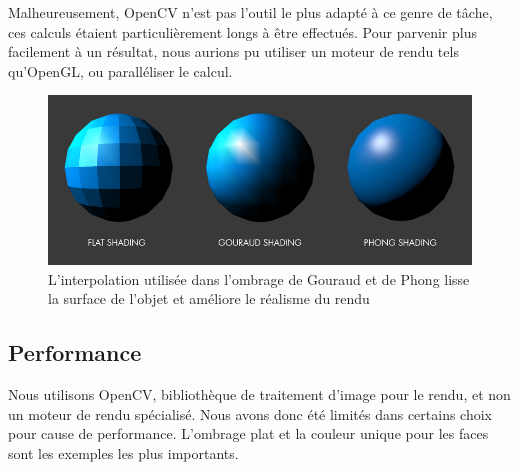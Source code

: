     Malheureusement, OpenCV n'est pas l'outil le plus adapté à ce genre de tâche, ces calculs étaient particulièrement longs à être effectués. Pour parvenir plus facilement à un résultat, nous aurions pu utiliser un moteur de rendu tels qu'OpenGL, ou paralléliser le calcul.

    \begin{figure}[!h]
        \centering
        \includegraphics[scale=0.25]{img/shading.png}
        \caption{L'interpolation utilisée dans l'ombrage de Gouraud et de Phong lisse la surface de l'objet et améliore le réalisme du rendu}
    \end{figure}

    \subsection{Performance}

    Nous utilisons OpenCV, bibliothèque de traitement d'image pour le rendu, et non un moteur de rendu spécialisé. Nous avons donc été limités dans certains choix pour cause de performance. L'ombrage plat et la couleur unique pour les faces sont les exemples les plus importants.